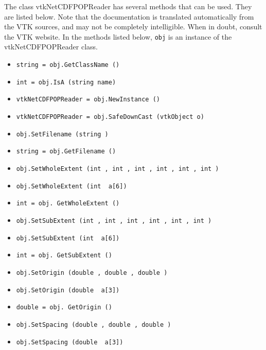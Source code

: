 The class vtkNetCDFPOPReader has several methods that can be used.
  They are listed below.
Note that the documentation is translated automatically from the VTK sources,
and may not be completely intelligible.  When in doubt, consult the VTK website.
In the methods listed below, \verb|obj| is an instance of the vtkNetCDFPOPReader class.
\begin{itemize}
\item  \verb|string = obj.GetClassName ()|

\item  \verb|int = obj.IsA (string name)|

\item  \verb|vtkNetCDFPOPReader = obj.NewInstance ()|

\item  \verb|vtkNetCDFPOPReader = obj.SafeDownCast (vtkObject o)|

\item  \verb|obj.SetFilename (string )|

\item  \verb|string = obj.GetFilename ()|

\item  \verb|obj.SetWholeExtent (int , int , int , int , int , int )|

\item  \verb|obj.SetWholeExtent (int  a[6])|

\item  \verb|int = obj. GetWholeExtent ()|

\item  \verb|obj.SetSubExtent (int , int , int , int , int , int )|

\item  \verb|obj.SetSubExtent (int  a[6])|

\item  \verb|int = obj. GetSubExtent ()|

\item  \verb|obj.SetOrigin (double , double , double )|

\item  \verb|obj.SetOrigin (double  a[3])|

\item  \verb|double = obj. GetOrigin ()|

\item  \verb|obj.SetSpacing (double , double , double )|

\item  \verb|obj.SetSpacing (double  a[3])|


\end{itemize}
